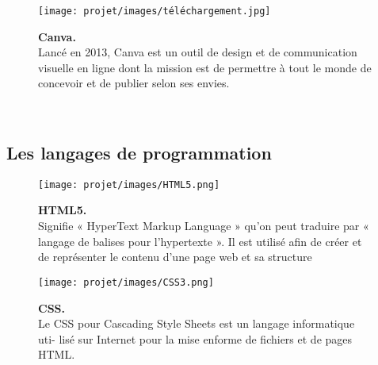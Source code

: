 \begin{figure}[H]
    \centering
    \begin{minipage}[c]{0.3\textwidth}
        \texttt{[image: projet/images/téléchargement.jpg]}
    \end{minipage}
    \hspace{1cm}
    \begin{minipage}[c]{0.6\textwidth}
        \textbf{Canva.}\\[0.5em]
        Lancé en 2013, Canva est un outil de design et de communication visuelle en ligne dont la mission est de permettre à tout le monde de concevoir et de publier selon ses envies.\cite{ref27}
    \end{minipage}
\end{figure}

\
\subsection{Les langages de programmation}
\begin{figure}[H]
    \centering
    \begin{minipage}[c]{0.3\textwidth}
      \texttt{[image: projet/images/HTML5.png]}
    \end{minipage}
    \hspace{1cm}
    \begin{minipage}[c]{0.6\textwidth}
        \textbf{HTML5.}\\[0.5em]
        Signifie « HyperText Markup Language » qu'on peut traduire par « langage de balises pour l'hypertexte ». Il est utilisé afin de créer et de représenter le contenu d'une page web et sa structure\cite{ref9}
    \end{minipage}
\end{figure}

\vspace{0.5cm}

\begin{figure}[H]
    \centering
    \begin{minipage}[c]{0.3\textwidth}
        \texttt{[image: projet/images/CSS3.png]}
    \end{minipage}
    \hspace{1cm}
    \begin{minipage}[c]{0.6\textwidth}
        \textbf{CSS.}\\[0.5em]
      Le CSS pour Cascading Style Sheets est un langage informatique uti-
lisé sur Internet pour la mise enforme de fichiers et de pages HTML.\cite{ref10}
    \end{minipage}
\end{figure}

